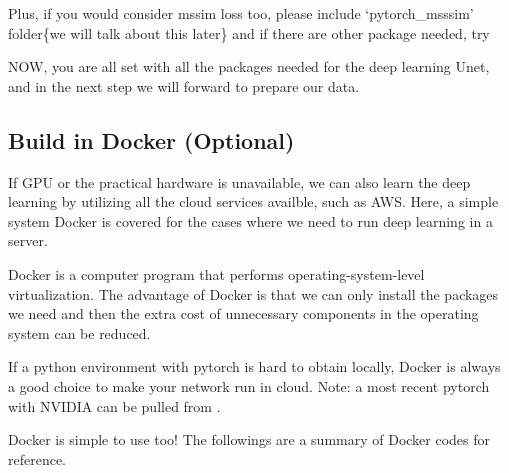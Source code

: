 \documentclass[letterpaper,10pt,english]{sphinxmanual}
\begin{document}
Plus, if you would consider mssim loss too, please include ‘pytorch\_msssim’ folder\{we will talk about this later\} and if there are other package needed, try 

%
\begin{sphinxVerbatim}[commandchars=\\\{\}]
\end{sphinxVerbatim}

NOW, you are all set with all the packages needed for the deep learning Unet, and in the next step we will forward to prepare our data.


\subsection{Build in Docker (Optional)}
\label{\detokenize{usage/installation:build-in-docker-optional}}
If GPU or the practical hardware is unavailable, we can also learn the deep learning by utilizing all the cloud services availble, such as AWS. Here, a simple system Docker is covered for the cases where we need to run deep learning in a server.

Docker is a computer program that performs operating-system-level virtualization. The advantage of Docker is that we can only install the packages we need and then the extra cost of unnecessary components in the operating system can be reduced.




If a python environment with pytorch is hard to obtain locally, Docker is always a good choice to make your network run in cloud. Note: a most recent pytorch with NVIDIA can be pulled from .



Docker is simple to use too! The followings are a summary of Docker codes for reference.
\end{document}
